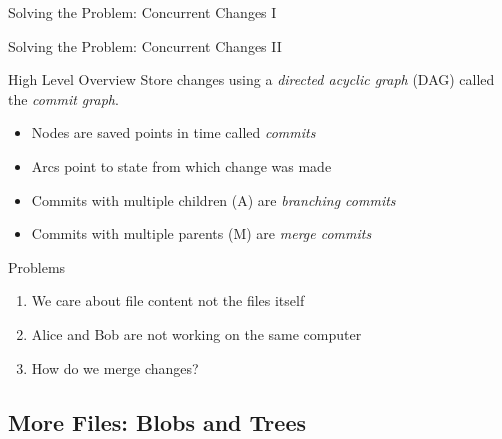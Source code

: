 \documentclass[xetex, handout]{beamer}
\begin{document}
\begin{frame}[fragile]{Solving the Problem: Concurrent Changes I}
\end{frame}

\begin{frame}{Solving the Problem: Concurrent Changes II}
  \begin{block}{High Level Overview}
    Store changes using a \emph{directed acyclic graph} (DAG) called
    the \emph{commit graph}.
    \begin{itemize}
      \item Nodes are saved points in time called \emph{commits}
      \item Arcs point to state from which change was made
      \item Commits with multiple children (A) are \emph{branching commits}
      \item Commits with multiple parents (M) are \emph{merge commits}
    \end{itemize}
  \end{block}
  \begin{alertblock}{Problems}
    \begin{enumerate}
      \item We care about file content not the files itself
      \item Alice and Bob are not working on the same computer
      \item How do we merge changes?
    \end{enumerate}
  \end{alertblock}
\end{frame}

\subsection{More Files: Blobs and Trees}
\end{document}

